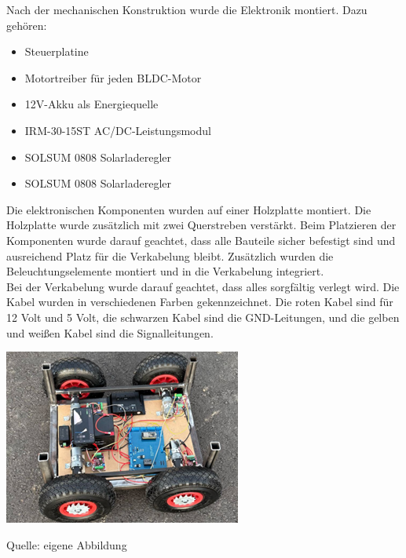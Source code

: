 \documentclass[ngerman,12pt,a4paper]{article}
\begin{document}
	 Nach der mechanischen Konstruktion wurde die Elektronik montiert. Dazu gehören:
	 \begin{itemize}
	 	\item Steuerplatine
	 	\item Motortreiber für jeden BLDC-Motor
	 	\item 12V-Akku als Energiequelle
	 	\item IRM-30-15ST AC/DC-Leistungsmodul
	 	\item SOLSUM 0808 Solarladeregler
	 	\item SOLSUM 0808 Solarladeregler
	 \end{itemize} 
	 Die elektronischen Komponenten wurden auf einer Holzplatte montiert. Die Holzplatte wurde zusätzlich mit zwei Querstreben verstärkt. Beim Platzieren der Komponenten wurde darauf geachtet, dass alle Bauteile sicher befestigt sind und ausreichend Platz für die Verkabelung bleibt. Zusätzlich wurden die Beleuchtungselemente montiert und in die Verkabelung integriert. \\[0.5cm]
	 Bei der Verkabelung wurde darauf geachtet, dass alles sorgfältig verlegt wird. Die Kabel wurden in verschiedenen Farben gekennzeichnet. Die roten Kabel sind für 12 Volt und 5 Volt, die schwarzen Kabel sind die GND-Leitungen, und die gelben und weißen Kabel sind die Signalleitungen.
	 
	 \begin{center} 
	 	\begin{minipage}[t]{0.5\textwidth}
	 		\includegraphics{Pictures/cb-verkabelt}
	 		\label{fig: cb-verkabelt}
	 		\vspace{-10pt}
	 		\begin{center}
	 			\par\small Quelle: eigene Abbildung
	 		\end{center}
	 	\end{minipage} \\[0.75cm]
	 \end{center}
	 \newpage
\end{document}

